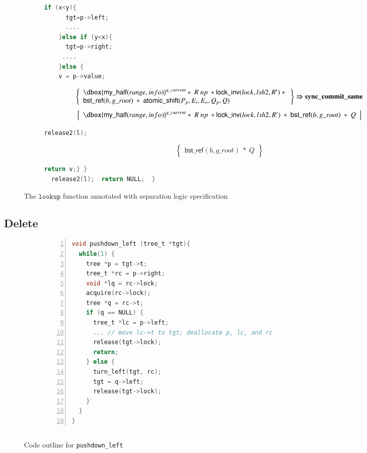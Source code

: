 \documentclass[runningheads]{llncs}
\newcommand\dboxed[1]{\dbox{\ensuremath{#1}}}
\newcommand{\ghost}[2]{\ensuremath{\dboxed{#1}^{#2}}}
\newcommand{\nodeboxrep}{\ensuremath{\mathsf{bst\_ref}}}
\begin{document}
{\begin{figure}[htp]
\begin{subfigure}[t]{1\textwidth}
\begin{lstlisting}[language = C,  numbers = none]
    if (x<y){
      tgt=p->left;
      ....
    }else if (y<x){
      tgt=p->right;
     ....
    }else {
    v = p->value;
           \end{lstlisting} 
  $$\left\{\begin{array}{l} \ghost{\mathsf{my\_half}(range,info)}{g\_current}*\ R\ np\ *\mathsf{lock\_inv}(lock,lsh2,R')\ *\ \\\nodeboxrep(b,g\_root)\ *\ \mathsf{atomic\_shift}(P_p,E_i,E_o,Q_p,Q)\end{array}\right\} \Rrightarrow{\textbf{sync\_commit\_same}}$$
$$\left\{\begin{array}{l} \ghost{\mathsf{my\_half}(range,info)}{g\_current}*\ R\ np\ *\mathsf{lock\_inv}(lock,lsh2,R')\ *\ \nodeboxrep(b,g\_root)\ *\ Q\end{array}\right\}$$
        \begin{lstlisting}[language = C,  numbers = none]
      release2(l);
         \end{lstlisting}
       $$\left\{\begin{array}{l} \nodeboxrep(b,g\_root)\ *\ Q\end{array}\right\}$$
         \begin{lstlisting}[language = C, numbers = none]
       return v;} }
  release2(l);  return NULL;  }
 \end{lstlisting} 
\end{subfigure}
\caption{The $\texttt{lookup}$ function annotated with separation logic specification}
\label{lookupproof}
\end{figure} }

\subsection{Delete}

\begin{figure}[t]%
\begin{subfigure}[t]{0.6\textwidth}
\begin{lstlisting}[language = C, basicstyle=\small\ttfamily, numbers=left]
void pushdown_left (tree_t *tgt){
  while(1) {
    tree *p = tgt->t;
    tree_t *rc = p->right;
    void *lq = rc->lock;
    acquire(rc->lock);
    tree *q = rc->t;
    if (q == NULL) {
      tree_t *lc = p->left;
      ... // move lc->t to tgt; deallocate p, lc, and rc
      release(tgt->lock);
      return;
    } else {
      turn_left(tgt, rc);
      tgt = q->left;
      release(tgt->lock);
    }
  }
}
\end{lstlisting} 
\end{subfigure}\qquad
\begin{subfigure}[t]{0.4\textwidth}
 \begin{lstlisting}[language = C, basicstyle=\small\ttfamily]

\end{lstlisting}
\end{subfigure}
\caption{Code outline for \lstinline{pushdown_left}}
\label{pushdown-left}
\end{figure}
\end{document}
